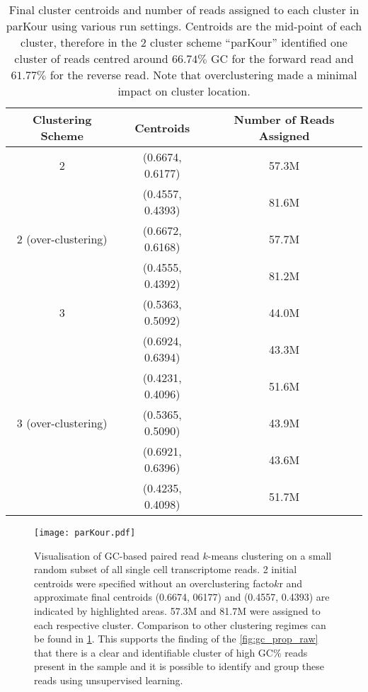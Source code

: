 \begin{table}
    \centering
    \begin{tabular}{|c||c|c|}
        \hline
        \textbf{Clustering Scheme} & \textbf{Centroids} & \textbf{Number of Reads Assigned} \\
        \hline
        2                    & (0.6674, 0.6177) & 57.3M \\
                             & (0.4557, 0.4393) & 81.6M \\
        \hline
        2 (over-clustering)   & (0.6672, 0.6168) & 57.7M \\
                             & (0.4555, 0.4392) & 81.2M \\
        \hline
        3                    & (0.5363, 0.5092) & 44.0M \\
                             & (0.6924, 0.6394) & 43.3M \\
                             & (0.4231, 0.4096) & 51.6M \\
        \hline
        3 (over-clustering)   & (0.5365, 0.5090) & 43.9M \\
                             & (0.6921, 0.6396) & 43.6M \\
                             & (0.4235, 0.4098) & 51.7M \\
        \hline
    \end{tabular} 
    \caption[ParKour cluster characteristics]{Final cluster centroids and number of reads assigned
    to each cluster in parKour using various run settings.  Centroids
    are the mid-point of each cluster, therefore in the 2 cluster scheme
    ``parKour'' identified one cluster of reads centred around  
    \(66.74\%\) GC for the forward read and \(61.77\%\) for the reverse read.
    Note that 
    overclustering made a minimal impact on cluster location.}
    \label{tab:centroids} 
\end{table} 


\begin{figure}[h!]
	\centering
    \texttt{[image: parKour.pdf]}
    \caption[Plot of parKour clusters]{Visualisation of GC-based paired read \(k\)-means clustering on a small random subset of all single cell transcriptome
        reads. 2 initial centroids were specified without an overclustering facto\(k\)r and approximate final centroids (0.6674, 06177) and (0.4557, 0.4393) are indicated by highlighted areas.  57.3M and 81.7M were assigned to each respective cluster. Comparison to other clustering regimes can be found in \cref{tab:centroids}.  This supports the finding of the \cref{fig:gc_prop_raw} that there is a clear and identifiable cluster of high GC\% reads present in the sample and it is possible to identify and group these reads using unsupervised learning. 
} 
        \label{fig:parkour} 
\end{figure}

